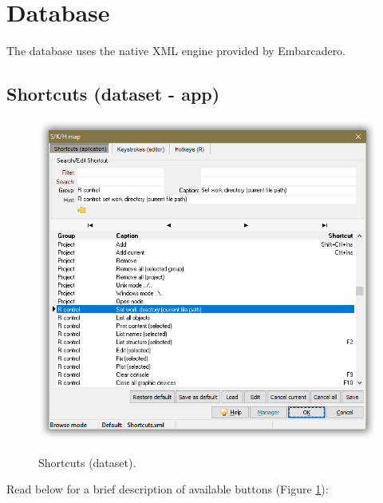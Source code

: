 
\hypertarget{working_database}{}
\section{Database}

The database uses the native XML engine provided by Embarcadero.

\subsection{Shortcuts (dataset - app)}

\begin{figure}[H]
  \includegraphics[scale=0.8]{./res/dlg_skh_map_shortcuts.png}\\
  \caption{Shortcuts (dataset).}
  \label{fig:dlg_skh_map_shortcuts}
\end{figure}

Read below for a brief description of available buttons (Figure \ref{fig:dlg_skh_map_shortcuts}):

